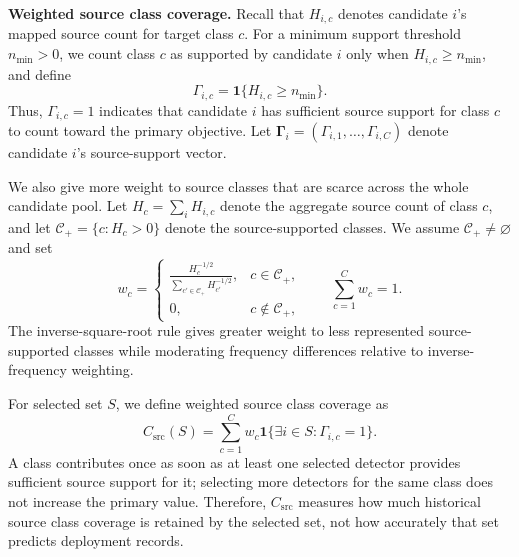 \documentclass[conference]{IEEEtran}
\theoremstyle{definition}
\newcommand{\bheading}[1]{\noindent\textbf{#1.}\xspace}
\begin{document}
\bheading{Weighted source class coverage}
Recall that $H_{i,c}$ denotes candidate $i$'s mapped source count for target class $c$.
For a minimum support threshold $n_{\min}>0$, we count class $c$ as supported by candidate $i$ only when $H_{i,c}\ge n_{\min}$, and define
\begin{equation}
\Gamma_{i,c}=\mathbf 1\{H_{i,c}\ge n_{\min}\}.
\label{eq:semantic_presence}
\end{equation}
Thus, $\Gamma_{i,c}=1$ indicates that candidate $i$ has sufficient source support for class $c$ to count toward the primary objective. Let $\boldsymbol\Gamma_i=(\Gamma_{i,1},\ldots,\Gamma_{i,C})$ denote candidate $i$'s source-support vector.

We also give more weight to source classes that are scarce across the whole candidate pool.
Let $H_c=\sum_iH_{i,c}$ denote the aggregate source count of class $c$, and let $\mathcal C_+=\{c:H_c>0\}$ denote the source-supported classes.
We assume $\mathcal C_+\ne\varnothing$ and set
\begin{equation}
w_c=
\begin{cases}
\displaystyle
\frac{H_c^{-1/2}}{\sum_{c'\in\mathcal C_+}H_{c'}^{-1/2}},
& c\in\mathcal C_+,\\[2mm]
0, & c\notin\mathcal C_+,
\end{cases}
\qquad
\sum_{c=1}^{C}w_c=1.
\label{eq:semantic_weights}
\end{equation}
The inverse-square-root rule gives greater weight to less represented source-supported classes while moderating frequency differences relative to inverse-frequency weighting.

For selected set $S$, we define weighted source class coverage as
\begin{equation}
C_{\mathrm{src}}(S)=
\sum_{c=1}^{C}w_c
\mathbf 1\{\exists i\in S:\Gamma_{i,c}=1\}.
\label{eq:source_coverage}
\end{equation}
A class contributes once as soon as at least one selected detector provides sufficient source support for it; selecting more detectors for the same class does not increase the primary value.
Therefore, $C_{\mathrm{src}}$ measures how much historical source class coverage is retained by the selected set, not how accurately that set predicts deployment records.
\end{document}
